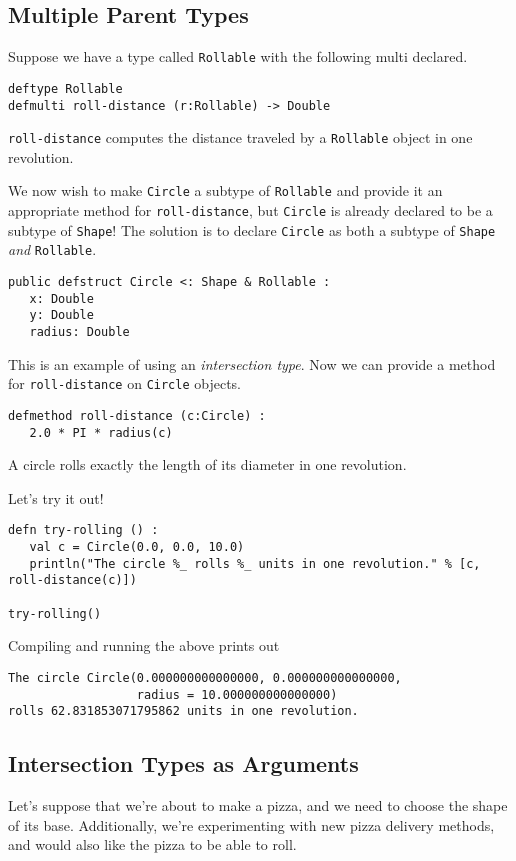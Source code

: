 \documentclass[10pt,oneside]{book}
\begin{document}
\subsection*{Multiple Parent Types}
Suppose we have a type called \texttt{\frenchspacing Rollable} with the following multi declared.
\begin{lstlisting}
deftype Rollable
defmulti roll-distance (r:Rollable) -> Double
\end{lstlisting}
\texttt{\frenchspacing roll-distance} computes the distance traveled by a \texttt{\frenchspacing Rollable} object in one revolution.

We now wish to make \texttt{\frenchspacing Circle} a subtype of \texttt{\frenchspacing Rollable} and provide it an appropriate method for \texttt{\frenchspacing roll-distance}, but \texttt{\frenchspacing Circle} is already declared to be a subtype of \texttt{\frenchspacing Shape}! The solution is to declare \texttt{\frenchspacing Circle} as both a subtype of \texttt{\frenchspacing Shape} {\em and} \texttt{\frenchspacing Rollable}. 
\begin{lstlisting}
public defstruct Circle <: Shape & Rollable :
   x: Double
   y: Double
   radius: Double
\end{lstlisting}
This is an example of using an {\em intersection type}. Now we can provide a method for \texttt{\frenchspacing roll-distance} on \texttt{\frenchspacing Circle} objects.
\begin{lstlisting}
defmethod roll-distance (c:Circle) :
   2.0 * PI * radius(c)
\end{lstlisting}
A circle rolls exactly the length of its diameter in one revolution.

Let's try it out!
\begin{lstlisting}
defn try-rolling () :
   val c = Circle(0.0, 0.0, 10.0)
   println("The circle %_ rolls %_ units in one revolution." % [c, roll-distance(c)])

try-rolling()
\end{lstlisting}
Compiling and running the above prints out
\begin{lstlisting}
The circle Circle(0.000000000000000, 0.000000000000000,
                  radius = 10.000000000000000) 
rolls 62.831853071795862 units in one revolution.
\end{lstlisting}

\subsection*{Intersection Types as Arguments}
Let's suppose that we're about to make a pizza, and we need to choose the shape of its base. Additionally, we're experimenting with new pizza delivery methods, and would also like the pizza to be able to roll.
\end{document}
